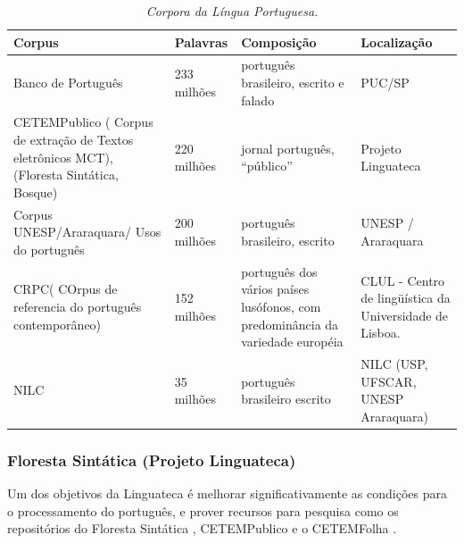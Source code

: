 \begin{table}
   \centering
   \small
   \caption{\it Corpora da Língua Portuguesa.}

    \begin{tabular}{ | p{5cm} | p{3cm} | p{3cm} | p{3cm} | }
      \hline
        \textbf{Corpus} & \textbf{Palavras} & \textbf{Composição}& \textbf{Localização}\\
        \hline
        \hline

        Banco de Português &  233 milhões & português brasileiro, escrito e falado & PUC/SP \\

        \hline

        CETEMPublico ( Corpus de extração de Textos eletrônicos MCT), (Floresta Sintática, Bosque) & 220 milhões & jornal português, ``público'' & Projeto Linguateca \\

        \hline

        Corpus UNESP/Araraquara/ Usos do português & 200 milhões & português brasileiro, escrito & UNESP / Araraquara \\

        \hline

        CRPC( COrpus de referencia do português contemporâneo) & 152 milhões & português dos vários países lusófonos, com predominância da variedade européia & CLUL - Centro de lingüística da Universidade de Lisboa. \\

        \hline

        NILC & 35 milhões & português brasileiro escrito & NILC (USP, UFSCAR, UNESP Araraquara) \\
    \hline

   \end{tabular}
   \label{tbl:corpora_port}
\end{table}

\subsubsection{Floresta Sintática (Projeto Linguateca)}
\label{sub:sub_linguateca}

Um dos objetivos da Linguateca é melhorar significativamente as condições para o processamento do português, e prover recursos para pesquisa como os repositórios do Floresta Sintática , CETEMPublico e o CETEMFolha .

